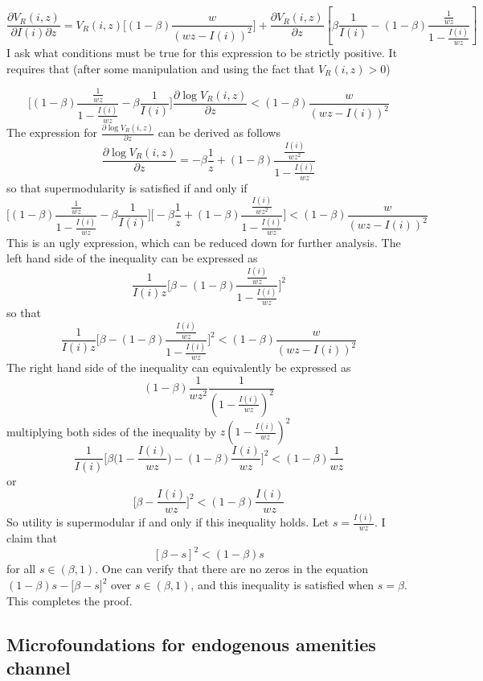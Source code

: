 \documentclass[12pt]{article}
\begin{document}
	$$\frac{\partial V_{R}(i, z)}{\partial I(i) \partial z}  = V_{R}(i, z)\bigg[(1-\beta) \frac{w}{(wz - I(i))^{2}}\bigg] + \frac{\partial V_{R}(i, z)}{\partial z}[\beta\frac{1}{I(i)} - (1-\beta)\frac{\frac{1}{wz}}{1 - \frac{I(i)}{wz}}]$$
	I ask what conditions must be true for this expression to be strictly positive. It requires that (after some manipulation and using the fact that $V_{R}(i, z) > 0$)
	
	$$\bigg[(1-\beta)\frac{\frac{1}{wz}}{1 - \frac{I(i)}{wz}} - \beta\frac{1}{I(i)}\bigg]\frac{\partial \log V_{R}(i, z)}{\partial z} < (1-\beta)\frac{w}{(wz - I(i))^{2}}$$
	The expression for $\frac{\partial \log V_{R}(i, z)}{\partial z }$ can be derived as follows 
	$$\frac{\partial \log V_{R}(i, z)}{\partial z } = -\beta \frac{1}{z} + (1-\beta)\frac{\frac{I(i)}{wz^{2}}}{1 - \frac{I(i)}{wz}}$$
	so that supermodularity is satisfied if and only if 
	$$\bigg[(1-\beta)\frac{\frac{1}{wz}}{1 - \frac{I(i)}{wz}} - \beta\frac{1}{I(i)}\bigg]\bigg[-\beta \frac{1}{z} + (1-\beta)\frac{\frac{I(i)}{wz^{2}}}{1 - \frac{I(i)}{wz}}\bigg] < (1-\beta)\frac{w}{(wz - I(i))^{2}}$$
	This is an ugly expression, which can be reduced down for further analysis. The left hand side of the inequality can be expressed as 
	$$\frac{1}{I(i)z}\bigg[\beta - (1-\beta)\frac{\frac{I(i)}{wz}}{1 - \frac{I(i)}{wz}}\bigg]^{2}$$ so that 
	$$\frac{1}{I(i)z}\bigg[\beta - (1-\beta)\frac{\frac{I(i)}{wz}}{1 - \frac{I(i)}{wz}}\bigg]^{2} < (1-\beta)\frac{w}{(wz - I(i))^{2}}$$
	The right hand side of the inequality can equivalently be expressed as $$(1-\beta)\frac{1}{wz^{2}}\frac{1}{(1 - \frac{I(i)}{wz})^{2}}$$
	multiplying both sides of the inequality by $z(1- \frac{I(i)}{wz})^{2}$ 
	$$\frac{1}{I(i)}\bigg[\beta\big(1 - \frac{I(i)}{wz}\big) - (1-\beta)\frac{I(i)}{wz}\bigg]^{2} < (1 - \beta)\frac{1}{wz}$$ or 
	$$\bigg[\beta - \frac{I(i)}{wz}\bigg]^{2} < (1-\beta)\frac{I(i)}{wz}$$
	So utility is supermodular if and only if this inequality holds. Let $s = \frac{I(i)}{wz}$. I claim that 
	$$[\beta - s]^{2} < (1-\beta)s$$ for all $s \in (\beta, 1)$. One can verify that there are no zeros in the equation $(1-\beta)s - \big[\beta - s]^{2}$ over $s \in (\beta, 1)$, and this inequality is satisfied when $s = \beta$. This completes the proof.
	
	\clearpage
	
	\subsection{Microfoundations for endogenous amenities channel}\label{microfoundations}
	
\end{document}
